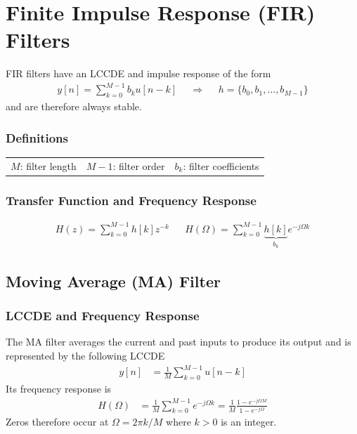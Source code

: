 
\section{Finite Impulse Response (FIR) Filters}
FIR filters have an LCCDE and impulse response of the form
\begin{align*}
	y[n] = \sum\limits_{k=0}^{M-1} b_ku[n-k] &&\Rightarrow&& h = \{ b_0, b_1, \hdots, b_{M-1} \}
\end{align*}
and are therefore always stable. 

\subsubsection{Definitions}
\begin{center}
\renewcommand{\arraystretch}{1}
\renewcommand{\tabcolsep}{4pt}
\hspace*{-4pt}
\begin{tabular}{lll}
	$M$: filter length & $M-1$: filter order & $b_k$: filter coefficients
\end{tabular}
\end{center}\vspace*{-1em}

\subsubsection{Transfer Function and Frequency Response}
\vspace{-1em}
\begin{align*}
	H(z) = \sum\limits_{k=0}^{M-1} h[k] z^{-k} && H(\Omega) = \sum\limits_{k=0}^{M-1} \underbrace{h[k]}_{b_k} e^{-j\Omega k}
\end{align*}
\vspace{-1em}


\subsection{Moving Average (MA) Filter}
\subsubsection{LCCDE and Frequency Response}
The MA filter averages the current and past inputs to produce its output and is represented by the following LCCDE
\begin{align*}
	y[n] &= \frac{1}{M} \sum\limits_{k=0}^{M-1} u[n-k]
\end{align*}
Its frequency response is
\begin{align*}
	H(\Omega) &= \frac{1}{M}\sum\limits_{k=0}^{M-1}e^{-j\Omega k} = \frac{1}{M}\frac{1-e^{-j\Omega M}}{1-e^{-j\Omega}}
\end{align*}
Zeros therefore occur at $\Omega = 2\pi k / M$ where $k>0$ is an integer.

